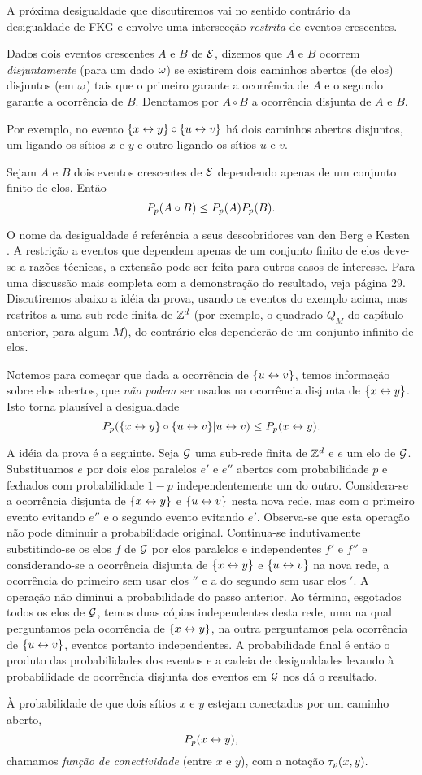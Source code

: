 A próxima desigualdade que discutiremos vai no sentido contrário da
desigualdade de
FKG e envolve uma intersecção {\em restrita} de eventos crescentes.

Dados dois eventos crescentes $A$ e $B$ de ${\cal E}$, dizemos que $A$ e $B$ ocorrem 
{\em disjuntamente} (para um dado $\omega$) se existirem dois caminhos abertos (de elos)
disjuntos (em $\omega$) tais que o primeiro garante a ocorrência de $A$ e o segundo 
garante a ocorrência de $B$.
Denotamos por $A\circ B$ a ocorrência disjunta de $A$ e $B$.

Por exemplo, no evento $\{x\leftrightarrow y\}\circ\{u\leftrightarrow v\}$ há dois caminhos abertos disjuntos,
um ligando os sítios $x$ e $y$ e outro ligando os sítios $u$ e $v$.

\vs

\bteo[Desigualdade de BK]

Sejam $A$ e $B$ dois eventos crescentes de ${\cal E}$
dependendo apenas de um conjunto finito de elos. Então
$$
P_p(A\circ B)\leq P_p(A)P_p(B).
$$
\eteo

\vs

O nome da desigualdade é referência a seus descobridores van den Berg e 
Kesten \cite{kn:vBK}.
A restrição a eventos que dependem apenas de um conjunto finito de elos
deve-se a
razões técnicas, a extensão pode ser feita para outros casos de interesse.
Para uma discussão mais completa com a demonstração do resultado, veja
\cite{kn:G} página 29. Discutiremos abaixo a idéia da prova, usando os eventos
do exemplo acima, mas restritos a uma sub-rede finita de $\mathbb{Z}^d$ (por exemplo, o quadrado 
$Q_M$ do capítulo anterior, para algum $M$), do contrário eles dependerão de um 
conjunto infinito de elos.

Notemos para começar que dada a ocorrência de $\{u\leftrightarrow v\}$, temos informação
sobre elos abertos, que {\em não podem} ser usados na ocorrência disjunta de
$\{x\leftrightarrow y\}$. Isto torna plausível a desigualdade
$$P_p(\{x\leftrightarrow y\}\circ\{u\leftrightarrow v\}|u\leftrightarrow v)\leq P_p(x\leftrightarrow y).$$

A idéia da prova é a seguinte. Seja ${\cal G}$ uma sub-rede finita de $\mathbb{Z}^d$ e $e$ um
elo de ${\cal G}$. Substituamos $e$ por dois elos paralelos 
$e'$ e $e''$ abertos com probabilidade $p$ e fechados com probabilidade $1-p$
independentemente um do outro. Considera-se a ocorrência disjunta de 
$\{x\leftrightarrow y\}$ e $\{u\leftrightarrow v\}$ nesta nova rede, mas com o primeiro evento evitando
$e''$ e o segundo evento evitando $e'$. Observa-se que esta operação não pode
diminuir a probabilidade original. Continua-se
indutivamente substitindo-se os elos $f$ de ${\cal G}$ por elos paralelos 
e independentes
$f'$ e $f''$ e considerando-se a ocorrência disjunta de $\{x\leftrightarrow y\}$ e $\{u\leftrightarrow v\}$
na nova rede, a ocorrência do primeiro sem usar elos $''$ e a do segundo
sem usar elos $'$. A operação não diminui a probabilidade do passo anterior. 
Ao término, esgotados todos os elos de ${\cal G}$, temos
duas cópias independentes desta rede, uma na qual perguntamos pela ocorrência de
$\{x\leftrightarrow y\}$, na outra perguntamos pela ocorrência de
$\{u\leftrightarrow v\}$, eventos portanto independentes. A probabilidade final é então o produto
das probabilidades dos eventos e a cadeia de desigualdades levando à probabilidade
de ocorrência disjunta dos eventos em ${\cal G}$ nos dá o resultado.

\begin{defin}
\label{def:con}
À probabilidade de que dois sítios $x$ e $y$ estejam conectados por um caminho
aberto, $$P_p(x\leftrightarrow y),$$
chamamos {\em função de conectividade} (entre $x$ e $y$), com a notação
$\tau_p(x,y).$
\end{defin}